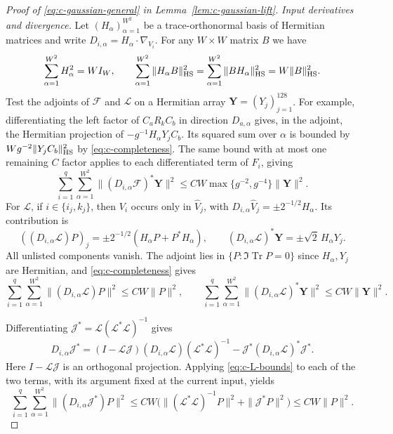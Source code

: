 \documentclass[11pt]{article}
\numberwithin{equation}{section}
\theoremstyle{remark}
\newcommand{\Tr}{\operatorname{Tr}}
\begin{document}
\begin{proof}[Proof of \eqref{eq:c-gaussian-general} in Lemma~\ref{lem:c-gaussian-lift}]
\smallskip\noindent\emph{Input derivatives and divergence.}
Let $(H_\alpha)_{\alpha=1}^{W^2}$ be a trace-orthonormal basis of
Hermitian matrices and write $D_{i,\alpha}=H_\alpha\cdot\nabla_{V_i}$.
For any $W\times W$ matrix $B$ we have
\begin{equation}\label{eq:c-completeness}
 \sum_{\alpha=1}^{W^2}H_\alpha^2=WI_W,\qquad
 \sum_{\alpha=1}^{W^2}\|H_\alpha B\|_{\rm HS}^2
 =\sum_{\alpha=1}^{W^2}\|BH_\alpha\|_{\rm HS}^2=W\|B\|_{\rm HS}^2.
\end{equation}
Test the adjoints of $\mathcal F$ and $\mathcal L$ on a Hermitian array
$\mathbf Y=(Y_j)_{j=1}^{128}$. For example, differentiating the left
factor of $C_aR_kC_b$ in direction $D_{a,\alpha}$ gives, in the adjoint,
the Hermitian projection of $-g^{-1}H_\alpha Y_jC_b$. Its squared sum
over $\alpha$ is bounded by $Wg^{-2}\|Y_jC_b\|_{\rm HS}^2$ by
\eqref{eq:c-completeness}. The same bound with at most one remaining
$C$ factor applies to each differentiated term of $F_i$, giving
\begin{equation}\label{eq:c-F-bounds}
 \sum_{i=1}^q\sum_{\alpha=1}^{W^2}\|(D_{i,\alpha}\mathcal F)^*\mathbf Y\|^2
 \le CW\max\{g^{-2},g^{-4}\}\|\mathbf Y\|^2.
\end{equation}
For $\mathcal L$, if $i\in\{i_j,k_j\}$, then $V_i$ occurs only in
$\widehat V_j$, with $D_{i,\alpha}\widehat V_j=\pm2^{-1/2}H_\alpha$. Its contribution is
\[
 ((D_{i,\alpha}\mathcal L)P)_j
 =\pm2^{-1/2}(H_\alpha P+P^*H_\alpha),\qquad
 (D_{i,\alpha}\mathcal L)^*\mathbf Y=\pm\sqrt2\,H_\alpha Y_j.
\]
All unlisted components vanish. The adjoint lies in
$\{P:\Im\Tr P=0\}$ since $H_\alpha,Y_j$ are Hermitian, and
\eqref{eq:c-completeness} gives
\begin{equation}\label{eq:c-L-bounds}
 \sum_{i=1}^q\sum_{\alpha=1}^{W^2}\|(D_{i,\alpha}\mathcal L)P\|^2\le CW\|P\|^2,\qquad
 \sum_{i=1}^q\sum_{\alpha=1}^{W^2}\|(D_{i,\alpha}\mathcal L)^*\mathbf Y\|^2\le CW\|\mathbf Y\|^2.
\end{equation}

Differentiating $\mathcal J^*=\mathcal L(\mathcal L^*\mathcal L)^{-1}$ gives
\begin{equation}\label{eq:c-lift-derivative}
 D_{i,\alpha}\mathcal J^*
 =(I-\mathcal L\mathcal J)(D_{i,\alpha}\mathcal L)(\mathcal L^*\mathcal L)^{-1}
       -\mathcal J^*(D_{i,\alpha}\mathcal L)^*\mathcal J^*.
\end{equation}
Here $I-\mathcal L\mathcal J$ is an orthogonal projection. Applying
\eqref{eq:c-L-bounds} to each of the two terms, with its argument fixed
at the current input, yields
\begin{equation}\label{eq:c-J-bound}
 \sum_{i=1}^q\sum_{\alpha=1}^{W^2}\|(D_{i,\alpha}\mathcal J^*)P\|^2
 \le CW\bigl(\|(\mathcal L^*\mathcal L)^{-1}P\|^2
                 +\|\mathcal J^*P\|^2\bigr)
 \le CW\|P\|^2.
\end{equation}


\end{proof}
\end{document}
